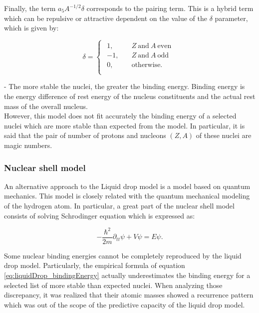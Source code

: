 \documentclass[openany]{book}
\begin{document}
Finally, the term $a_5 A^{-1/2} \delta$ corresponds to the pairing term. This is a hybrid term which can be repulsive or attractive dependent on the value of the $\delta$ parameter, which is given by:

\begin{equation} \label{eq:liquidDrop_deltaFactor}
	\delta = 	\left\{\begin{array}{l}
		\begin{split}
			1, \quad & Z \ \mathrm{and} \ A \  \mathrm{even} \\ 
			-1, \quad &  Z \ \mathrm{and} \ A \  \mathrm{odd} 	\\
			0, \quad & \mathrm{otherwise}.	\\
		\end{split}
	\end{array}\right.
\end{equation}

-	The more stable the nuclei, the greater the binding energy.
Binding energy is the energy difference of rest energy of the nucleus constituents and the actual  rest mass of the overall nucleus. \\

However, this model does not fit accurately the binding energy of a selected nuclei which are more stable than expected from the model. In particular, it is said that the pair of number of protons and nucleons $(Z, A)$ of these nuclei are magic numbers. 



\subsubsection{Nuclear shell model}  \label{ssub:nuclearShellModel}

An alternative approach to the Liquid drop model is a model based on quantum mechanics. This model is closely related with the quantum mechanical modeling of the hydrogen atom. In particular, a great part of the nuclear shell model consists of solving Schrodinger equation which is expressed as:

\begin{equation} \label{eq:nuclearShell_schrodinger}
	- \frac{\hbar^2}{2m} \partial_{tt} \psi + V  \psi = E \psi.
\end{equation}

Some nuclear binding energies cannot be completely reproduced by the liquid drop model. Particularly, the empirical formula of equation \ref{eq:liquidDrop_bindingEnergy} actually underestimates the binding energy for a selected list of more stable than expected nuclei. When analyzing those discrepancy, it was realized that their atomic masses showed a recurrence pattern which was out of the scope of the predictive capacity of the liquid drop model.  \\
\end{document}
